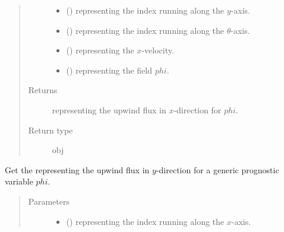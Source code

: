 \documentclass[letterpaper,10pt,english]{sphinxmanual}
\begin{document}
\begin{fulllineitems}
\begin{fulllineitems}
\begin{quote}
\begin{description}
\begin{itemize}
\item {} 
 () \textendash{}  representing the index running along the \(y\)-axis.

\item {} 
 () \textendash{}  representing the index running along the \(\theta\)-axis.

\item {} 
 () \textendash{}  representing the \(x\)-velocity.

\item {} 
 () \textendash{}  representing the field \(phi\).

\end{itemize}

\item[{Returns}] \leavevmode
{} representing the upwind flux in \(x\)-direction for \(phi\).

\item[{Return type}] \leavevmode
obj

\end{description}\end{quote}

\end{fulllineitems}


\begin{fulllineitems}
\label{\detokenize{api:dycore.flux_isentropic_upwind.FluxIsentropicUpwind._get_upwind_flux_y}}
Get the  representing the upwind flux in \(y\)-direction
for a generic prognostic variable \(phi\).
\begin{quote}\begin{description}
\item[{Parameters}] \leavevmode\begin{itemize}
\item {} 
 () \textendash{}  representing the index running along the \(x\)-axis.


\end{itemize}
\end{description}
\end{quote}
\end{fulllineitems}
\end{fulllineitems}
\end{document}
